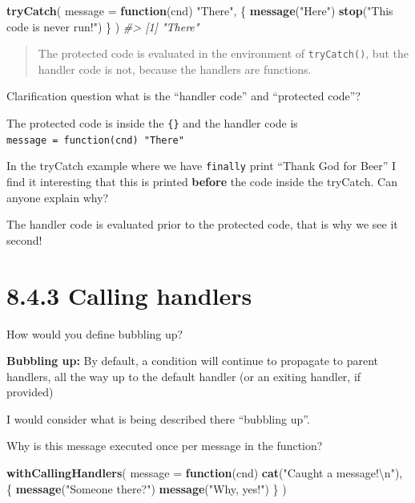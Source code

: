 \documentclass[]{book}
\newenvironment{Shaded}{\begin{snugshade}}{\end{snugshade}}
\newcommand{\CharTok}[1]{\textcolor[rgb]{0.31,0.60,0.02}{#1}}
\newcommand{\CommentTok}[1]{\textcolor[rgb]{0.56,0.35,0.01}{\textit{#1}}}
\newcommand{\ControlFlowTok}[1]{\textcolor[rgb]{0.13,0.29,0.53}{\textbf{#1}}}
\newcommand{\DataTypeTok}[1]{\textcolor[rgb]{0.13,0.29,0.53}{#1}}
\newcommand{\KeywordTok}[1]{\textcolor[rgb]{0.13,0.29,0.53}{\textbf{#1}}}
\newcommand{\NormalTok}[1]{#1}
\newcommand{\StringTok}[1]{\textcolor[rgb]{0.31,0.60,0.02}{#1}}
\begin{document}
\begin{Shaded}
\begin{Highlighting}[]
\KeywordTok{tryCatch}\NormalTok{(}
  \DataTypeTok{message =} \ControlFlowTok{function}\NormalTok{(cnd) }\StringTok{"There"}\NormalTok{,}
\NormalTok{  \{}
    \KeywordTok{message}\NormalTok{(}\StringTok{"Here"}\NormalTok{)}
    \KeywordTok{stop}\NormalTok{(}\StringTok{"This code is never run!"}\NormalTok{)}
\NormalTok{  \}}
\NormalTok{)}
\CommentTok{#> [1] "There"}
\end{Highlighting}
\end{Shaded}

\begin{quote}
The protected code is evaluated in the environment of \texttt{tryCatch()}, but the handler code is not, because the handlers are functions.
\end{quote}

Clarification question what is the ``handler code'' and ``protected code''?

The protected code is inside the \texttt{\{\}} and the handler code is \texttt{message\ =\ function(cnd)\ "There"}

In the tryCatch example where we have \texttt{finally} print ``Thank God for Beer'' I find it interesting that this is printed \textbf{before} the code inside the tryCatch. Can anyone explain why?

The handler code is evaluated prior to the protected code, that is why we see it second!

\hypertarget{calling-handlers}{%
\section*{8.4.3 Calling handlers}\label{calling-handlers}}

How would you define bubbling up?

\textbf{Bubbling up:} By default, a condition will continue to propagate to parent handlers, all the way up to the default handler (or an exiting handler, if provided)

I would consider what is being described there ``bubbling up''.

Why is this message executed once per message in the function?

\begin{Shaded}
\begin{Highlighting}[]
\KeywordTok{withCallingHandlers}\NormalTok{(}
  \DataTypeTok{message =} \ControlFlowTok{function}\NormalTok{(cnd) }\KeywordTok{cat}\NormalTok{(}\StringTok{"Caught a message!}\CharTok{\textbackslash{}n}\StringTok{"}\NormalTok{), }
\NormalTok{  \{}
    \KeywordTok{message}\NormalTok{(}\StringTok{"Someone there?"}\NormalTok{)}
    \KeywordTok{message}\NormalTok{(}\StringTok{"Why, yes!"}\NormalTok{)}
\NormalTok{  \}}
\NormalTok{)}
\end{Highlighting}
\end{Shaded}
\end{document}
